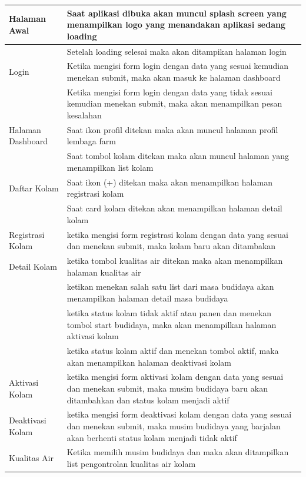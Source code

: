 \begin{enumerate}
\begin{longtable}[c]{@{} |p{4cm}|p{9.3cm}| @{}}
  \hline
  Halaman Awal & Saat aplikasi dibuka akan muncul splash screen yang menampilkan logo yang menandakan aplikasi sedang loading\\
  \hline
   & Setelah loading selesai maka akan ditampikan halaman login\\
  \hline
  Login & Ketika mengisi form login dengan data yang sesuai kemudian menekan submit, maka akan masuk ke halaman dashboard\\
  \hline
   & Ketika mengisi form login dengan data yang tidak sesuai kemudian menekan submit, maka akan menampilkan pesan kesalahan\\
  \hline
  Halaman Dashboard & Saat ikon profil ditekan maka akan muncul halaman profil lembaga farm\\
  \hline
   & Saat tombol kolam ditekan maka akan muncul halaman yang menampilkan list kolam\\
  \hline
  Daftar Kolam & Saat ikon (+) ditekan maka akan menampilkan halaman registrasi kolam\\
  \hline
   & Saat card kolam ditekan akan menampilkan halaman detail kolam\\
  \hline
  Registrasi Kolam & ketika mengisi form registrasi kolam dengan data yang sesuai dan menekan submit, maka kolam baru akan ditambakan\\
  \hline
  Detail Kolam & ketika tombol kualitas air ditekan maka akan menampilkan halaman kualitas air\\
  \hline
   & ketikan menekan salah satu list dari masa budidaya akan menampilkan halaman detail masa budidaya\\
  \hline
   & ketika status kolam tidak aktif atau panen dan menekan tombol start budidaya, maka akan menampilkan halaman aktivasi kolam\\
  \hline
   & ketika status kolam aktif dan menekan tombol aktif, maka akan menampilkan halaman deaktivasi kolam\\
  \hline
  Aktivasi Kolam & ketika mengisi form aktivasi kolam dengan data yang sesuai dan menekan submit, maka musim budidaya baru akan ditambahkan dan status kolam menjadi aktif\\
  \hline
  Deaktivasi Kolam & ketika mengisi form deaktivasi kolam dengan data yang sesuai dan menekan submit, maka musim budidaya yang barjalan akan berhenti status kolam menjadi tidak aktif\\
  \hline
  Kualitas Air & Ketika memilih musim budidaya dan maka akan ditampilkan list pengontrolan kualitas air kolam\\

\end{longtable}
\end{enumerate}
